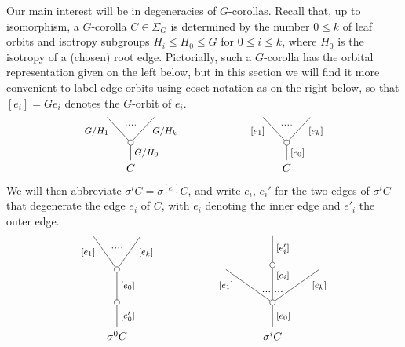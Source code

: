 \documentclass[a4paper,10pt
,draft
]{article}%
\numberwithin{equation}{section}
\numberwithin{figure}{section}
\theoremstyle{definition} %
\newcommand{\1}{\ensuremath{\mathbbm 1}}%
\begin{document}
Our main interest will be in degeneracies of $G$-corollas. Recall that, up to isomorphism, 
a $G$-corolla $C \in \Sigma_G$ is determined by the number $0 \leq k$ of leaf orbits
and isotropy subgroups
$H_i \leq H_0 \leq G$ for $0 \leq i \leq k$,
where $H_0$ is the isotropy of a (chosen) root edge.
Pictorially, such a $G$-corolla has the orbital representation given on the left below,
but in this section we will find it more convenient to label edge orbits using coset notation as on the right below,
so that $[e_i] = G e_i$ denotes the $G$-orbit of $e_i$.
\[
\begin{tikzpicture}
[grow=up,auto,level distance=2.3em,every node/.style = {font=\footnotesize},dummy/.style={circle,draw,inner sep=0pt,minimum size=1.75mm}]
	\node at (0,0) [font=\normalsize]{$C$}
		child{node [dummy] {}
			child{
			edge from parent node [swap,near end] {$G/H_k$} node [name=Kn] {}}
			child{
			edge from parent node [near end] {$G/H_1$}
node [name=Kone,swap] {}}
		edge from parent node [swap] {$G/H_0$}
		};
		\draw [dotted,thick] (Kone) -- (Kn) ;
	\node at (5,0) [font=\normalsize]{$C$}
		child{node [dummy] {}
			child{
			edge from parent node [swap,near end] {$[e_k]$} node [name=Kn] {}}
			child{
			edge from parent node [near end] {$[e_1]$}
node [name=Kone,swap] {}}
		edge from parent node [swap] {$[e_0]$}
		};
		\draw [dotted,thick] (Kone) -- (Kn) ;
\end{tikzpicture}
\]
We will then abbreviate $\sigma^i C = \sigma^{[e_i]} C$, and write $e_i$, $e_i'$ for the two edges of $\sigma^i C $ that degenerate the edge $e_i$ of $C$,
with $e_i$ denoting the inner edge and $e'_i$ the outer
edge.
\[
\begin{tikzpicture}
[grow=up,auto,level distance=3em,
every node/.style = {font=\footnotesize},
dummy/.style={circle,draw,inner sep=0pt,minimum size=1.75mm}]
	\node at (0,0) [font=\normalsize]{$\sigma^0 C$}
		child{node [dummy] {}
			child{node [dummy] {}
				child{
				edge from parent node [swap,near end] {$[e_k]$} node [name=Kn] {}}
				child{
				edge from parent node [near end] {$[e_1]$}
node [name=Kone,swap] {}}
			edge from parent node [swap] {$[e_0]$}}
		edge from parent node [swap] {$[e'_0]$}
		};
		\draw [dotted,thick] (Kone) -- (Kn) ;
	\node at (5,0) [font=\normalsize]{$\sigma^i C$}
		child{node [dummy] {}
			child{
			edge from parent node [swap,near end] {$[e_k]$} node [near start,inner sep=1pt,name=Kn] {}}
			child[level distance=3.4em]{node [dummy] {}
				child[level distance=2.7em]{
				edge from parent node [swap] {$[e'_i]$}
}
			edge from parent node [near end,swap] {$[e_i]$}
node [near start,inner sep=1pt,name=Kone,swap] {}
node [near start,inner sep=1pt,name=Kone1] {}}
			child{
			edge from parent node [near end] {$[e_1]$}
node [swap] {}
node [near start,inner sep=1pt,name=Kn1,swap]{}}
		edge from parent node [swap] {$[e_0]$}
		};
		\draw [dotted,thick] (Kone) -- (Kn) ;
		\draw [dotted,thick] (Kone1) -- (Kn1) ;
\end{tikzpicture}
\]
\end{document}
